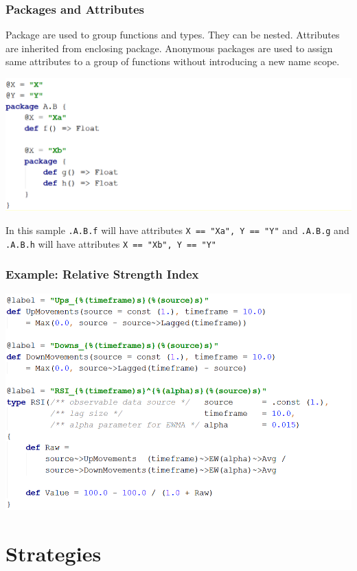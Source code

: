 \documentclass{beamer}
\begin{document}
\begin{frame}
\frametitle{Packages and Attributes}
Package are used to group functions and types. They can be nested. Attributes are inherited from enclosing package. Anonymous packages are used to assign same attributes to a group of functions without introducing a new name scope.

\includegraphics[width=1\linewidth]{packages.png}

In this sample \texttt{.A.B.f} will have attributes \texttt{X == "Xa", Y == "Y"} and \texttt{.A.B.g} and \texttt{.A.B.h} will have attributes \texttt{X == "Xb", Y == "Y"}

\end{frame}
\begin{frame}
\frametitle{Example: Relative Strength Index}
\includegraphics[width=1\linewidth]{rsi.png}
\end{frame}
\section{Strategies}
\end{document}
